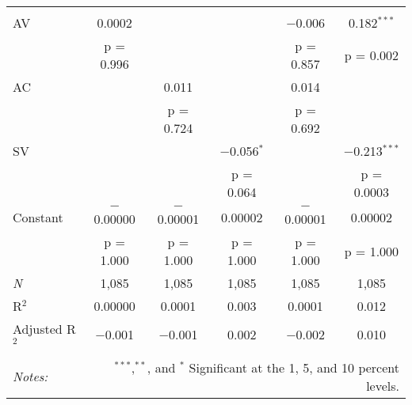 
\begin{tabular}{@{\extracolsep{5pt}}lccccc} 
\\[-1.8ex]
\hline \\[-1.8ex] 
 AV & 0.0002 &  &  & $-$0.006 & 0.182$^{***}$ \\ 
  & p = 0.996 &  &  & p = 0.857 & p = 0.002 \\ 
 AC &  & 0.011 &  & 0.014 &  \\ 
  &  & p = 0.724 &  & p = 0.692 &  \\ 
 SV &  &  & $-$0.056$^{*}$ &  & $-$0.213$^{***}$ \\ 
  &  &  & p = 0.064 &  & p = 0.0003 \\ 
 Constant & $-$0.00000 & $-$0.00001 & 0.00002 & $-$0.00001 & 0.00002 \\ 
  & p = 1.000 & p = 1.000 & p = 1.000 & p = 1.000 & p = 1.000 \\ 
\textit{N} & 1,085 & 1,085 & 1,085 & 1,085 & 1,085 \\ 
R$^{2}$ & 0.00000 & 0.0001 & 0.003 & 0.0001 & 0.012 \\ 
Adjusted R$^{2}$ & $-$0.001 & $-$0.001 & 0.002 & $-$0.002 & 0.010 \\ 
\hline \\[-1.8ex] 
\textit{Notes:} & \multicolumn{5}{r}{$^{***}$,$^{**}$, and $^{*}$ Significant at the 1, 5, and 10 percent levels.} \\ 
\end{tabular} 
